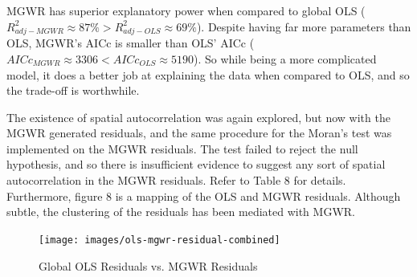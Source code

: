 \documentclass[
]{article}
\begin{document}
MGWR has superior explanatory power when compared to global OLS
(\(R_{adj-MGWR}^{2} \approx 87\% > R_{adj-OLS}^{2} \approx 69\%\)).
Despite having far more parameters than OLS, MGWR's AICc is smaller than
OLS' AICc (\(AICc_{MGWR} \approx 3306 < AICc_{OLS} \approx 5190\)). So
while being a more complicated model, it does a better job at explaining
the data when compared to OLS, and so the trade-off is worthwhile.

\newpage

The existence of spatial autocorrelation was again explored, but now
with the MGWR generated residuals, and the same procedure for the
Moran's test was implemented on the MGWR residuals. The test failed to
reject the null hypothesis, and so there is insufficient evidence to
suggest any sort of spatial autocorrelation in the MGWR residuals. Refer
to Table 8 for details. Furthermore, figure 8 is a mapping of the OLS
and MGWR residuals. Although subtle, the clustering of the residuals has
been mediated with MGWR.

\begin{table}[H]
\renewcommand{\arraystretch}{1.3} %
\setlength{\tabcolsep}{12pt} %
\centering
\caption{MGWR Residual Moran's I Test Results}
\label{tab:mgwr_morans_i}
\end{table}

\begin{figure}[H]

{\centering \texttt{[image: images/ols-mgwr-residual-combined]} 

}

\caption{Global OLS Residuals vs. MGWR Residuals}\label{fig:unnamed-chunk-20}
\end{figure}
\end{document}
